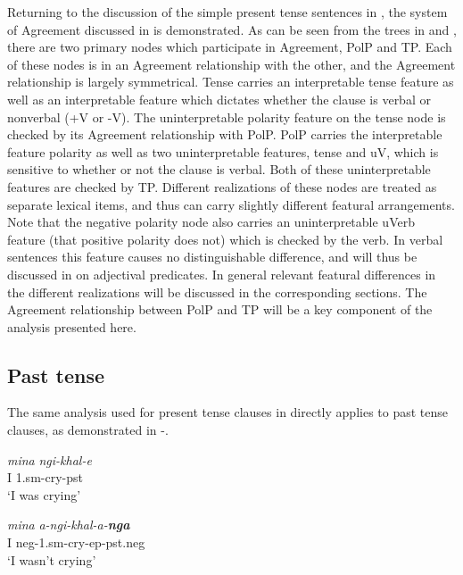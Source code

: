 \documentclass[output=paper]{langsci/langscibook}
\begin{document}
Returning to the discussion of the simple present tense sentences in , the system of Agreement discussed in  is demonstrated. As can be seen from the trees in  and , there are two primary nodes which participate in Agreement, PolP and TP. Each of these nodes is in an Agreement relationship with the other, and the Agreement relationship is largely symmetrical. Tense carries an interpretable tense feature as well as an interpretable feature which dictates whether the clause is verbal or nonverbal (+V or -V). The uninterpretable polarity feature on the tense node is checked by its Agreement relationship with PolP. PolP carries the interpretable feature polarity as well as two uninterpretable features, tense and uV, which is sensitive to whether or not the clause is verbal. Both of these uninterpretable features are checked by TP. Different realizations of these nodes are treated as separate lexical items, and thus can carry slightly different featural arrangements. Note that the negative polarity node also carries an uninterpretable uVerb feature (that positive polarity does not) which is checked by the verb. In verbal sentences this feature causes no distinguishable difference, and will thus be discussed in  on adjectival predicates. In general relevant featural differences in the different realizations will be discussed in the corresponding sections. The Agreement relationship between PolP and TP will be a key component of the analysis presented here.


\subsection{Past tense}

The same analysis used for present tense clauses in  directly applies to past tense clauses, as demonstrated in -.



\begin{exe}
\ex \begin{xlist}
\ex \gll \textit{mina} \textit{ngi-khal-e}\\
         I 1.{\sc sm}-cry-{\sc pst}\\
    \glt `I was crying'




\ex \gll \textit{mina} \textit{a-ngi-khal-a-\textbf{nga}}\\
         I {\sc neg}-1.{\sc sm}-cry-{\sc ep}-{\sc pst.neg}\\
    \glt `I wasn't crying'
\end{xlist}
\end{exe}
\end{document}
